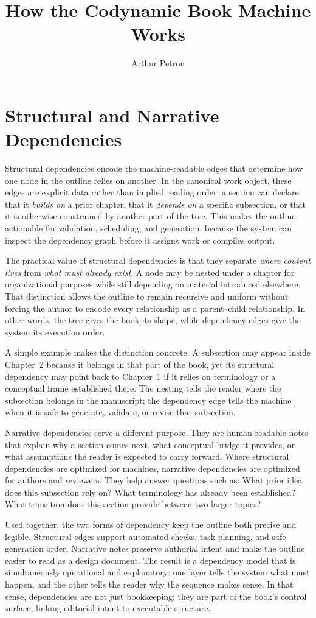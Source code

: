 \documentclass[11pt]{article}
\title{How the Codynamic Book Machine Works}
\author{Arthur Petron}
\begin{document}
\section*{Structural and Narrative Dependencies}

Structural dependencies encode the machine-readable edges that determine how one node in the outline relies on another. In the canonical work object, these edges are explicit data rather than implied reading order: a section can declare that it \emph{builds on} a prior chapter, that it \emph{depends on} a specific subsection, or that it is otherwise constrained by another part of the tree. This makes the outline actionable for validation, scheduling, and generation, because the system can inspect the dependency graph before it assigns work or compiles output.

The practical value of structural dependencies is that they separate \emph{where content lives} from \emph{what must already exist}. A node may be nested under a chapter for organizational purposes while still depending on material introduced elsewhere. That distinction allows the outline to remain recursive and uniform without forcing the author to encode every relationship as a parent--child relationship. In other words, the tree gives the book its shape, while dependency edges give the system its execution order.

A simple example makes the distinction concrete. A subsection may appear inside Chapter~2 because it belongs in that part of the book, yet its structural dependency may point back to Chapter~1 if it relies on terminology or a conceptual frame established there. The nesting tells the reader where the subsection belongs in the manuscript; the dependency edge tells the machine when it is safe to generate, validate, or revise that subsection.

Narrative dependencies serve a different purpose. They are human-readable notes that explain why a section comes next, what conceptual bridge it provides, or what assumptions the reader is expected to carry forward. Where structural dependencies are optimized for machines, narrative dependencies are optimized for authors and reviewers. They help answer questions such as: What prior idea does this subsection rely on? What terminology has already been established? What transition does this section provide between two larger topics?

Used together, the two forms of dependency keep the outline both precise and legible. Structural edges support automated checks, task planning, and safe generation order. Narrative notes preserve authorial intent and make the outline easier to read as a design document. The result is a dependency model that is simultaneously operational and explanatory: one layer tells the system what must happen, and the other tells the reader why the sequence makes sense. In that sense, dependencies are not just bookkeeping; they are part of the book's control surface, linking editorial intent to executable structure.
\end{document}
